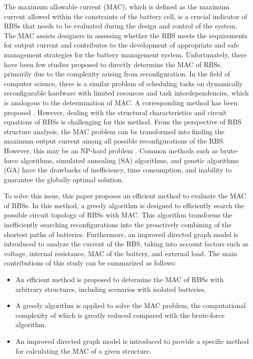 \documentclass{article}
\begin{document}
The maximum allowable current (MAC), which is defined as the maximum current allowed within the constraints of the battery cell, is a crucial indicator of RBSs that needs to be evaluated during the design and control of the system. 
The MAC assists designers in assessing whether the RBS meets the requirements for output current and contributes to the development of appropriate and safe management strategies for the battery management system. 
Unfortunately, there have been few studies proposed to directly determine the MAC of RBSs, primarily due to the complexity arising from reconfiguration. 
In the field of computer science, there is a similar problem of scheduling tasks on dynamically reconfigurable hardware with limited resources and task interdependencies, which is analogous to the determination of MAC. 
A corresponding method has been proposed \cite{mollajafariEfficientLightweightAlgorithm2023,heReconfigurationassistedChargingLargescale2014}. 
However, dealing with the structural characteristics and circuit equations of RBSs is challenging for this method.  
From the perspective of RBS structure analysis, the MAC problem can be transformed into finding the maximum output current among all possible reconfigurations of the RBS. 
However, this may be an NP-hard problem \cite{pinterReviewControlAlgorithms2021a}. 
Common methods such as brute-force algorithms, simulated annealing (SA) algorithms, and genetic algorithms (GA) have the drawbacks of inefficiency, time consumption, and inability to guarantee the globally optimal solution.


To solve this issue, this paper proposes an efficient method to evaluate the MAC of RBSs. 
In this method, a greedy algorithm is designed to efficiently search the possible circuit topology of RBSs with MAC.
This algorithm transforms the inefficiently searching reconfigurations into the proactively combining of the shortest paths of batteries.
Furthermore, an improved directed graph model is introduced to analyze the current of the RBS, taking into account factors such as voltage, internal resistance, MAC of the battery, and external load. 
The main contributions of this study can be summarized as follows:
\begin{itemize}
  \item An efficient method is proposed to determine the MAC of RBSs with arbitrary structures, including scenarios with isolated batteries.
  \item A greedy algorithm is applied to solve the MAC problem, the computational complexity of which is greatly reduced compared with the brute-force algorithm.
  \item An improved directed graph model is introduced to provide a specific method for calculating the MAC of a given structure.
\end{itemize}
\end{document}
